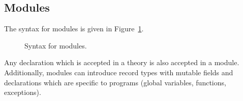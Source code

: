 


\subsection{Modules}

The syntax for modules is given in Figure~\ref{fig:bnf:module}.
\begin{figure}
  \begin{center}\framebox{}\end{center}
  \caption{Syntax for modules.}
\label{fig:bnf:module}
\end{figure}
Any declaration which is accepted in a theory is also accepted in a
module. Additionally, modules can introduce record types with mutable
fields and declarations which are specific to programs (global
variables, functions, exceptions).

